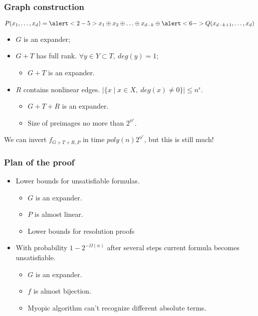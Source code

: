 \begin{frame}
    \frametitle{Graph construction}

    $P(x_1, \ldots, x_d) = \alert<2-5>{x_1 \oplus x_2 \oplus \ldots \oplus x_{d - k}} \oplus 
	\alert<6->{Q(x_{d - k + 1}, \ldots, x_d)}$
    
    \pause
    

    \begin{itemize}
	    \item $G$ is an expander;
   		\pause
        \pause
        \item $G + T$ has full rank. $\forall y \in Y \subset T, ~
		    deg(y) = 1$;
        \pause
        \begin{itemize}
	        \item $G + T$ is an expander.
        \end{itemize}
        \pause
        \item $R$ contains nonlinear edges. $|\{x \mid x \in X, ~ deg(x)
		    \ne 0\}| \le n^{\epsilon}$.
        \begin{itemize}
	        \item $G + T + R$ is an expander.
        	\pause
            \item Size of preimages no more than
				$2^{n^{\epsilon}}$.
        \end{itemize}
    \end{itemize}
    We can invert $f_{G + T + R, P}$ in time $poly(n) 2^{n^{\epsilon}}$,
	but this is still much! 
\end{frame}

\begin{frame}
	\frametitle{Plan of the proof}

	\begin{itemize}	       
		\pause
		\item Lower bounds for unsatisfiable formulas.
			\pause
            \begin{itemize}
	            \item $G$ is an expander.
	            \item $P$ is almost linear.
	            \item Lower bounds for resolution proofs
            \end{itemize}
		\pause
		\item With probability $1 - 2^{-\Omega(n)}$ after several steps
		        current formula becomes unsatisfiable.
            \pause
            \begin{itemize}
	            \item $G$ is an expander.
	            \item $f$ is almost bijection.
	            \item Myopic algorithm can't recognize different
		            absolute terms.
            \end{itemize}
	\end{itemize}
   
\end{frame}